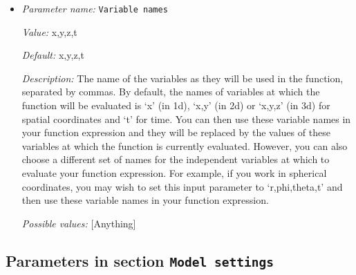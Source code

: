 \begin{itemize}
{\it Description:} The formula that denotes the function you want to evaluate for particular values of the independent variables. This expression may contain any of the usual operations such as addition or multiplication, as well as all of the common functions such as `sin' or `cos'. In addition, it may contain expressions like `if(x>0, 1, -1)' where the expression evaluates to the second argument if the first argument is true, and to the third argument otherwise. For a full overview of possible expressions accepted see the documentation of the muparser library at http://muparser.beltoforion.de/.

If the function you are describing represents a vector-valued function with multiple components, then separate the expressions for individual components by a semicolon.


{\it Possible values:} [Anything]
\item {\it Parameter name:} {\tt Variable names}
\label{parameters:Mesh refinement/Minimum refinement function/Variable names}


{\it Value:} x,y,z,t


{\it Default:} x,y,z,t


{\it Description:} The name of the variables as they will be used in the function, separated by commas. By default, the names of variables at which the function will be evaluated is `x' (in 1d), `x,y' (in 2d) or `x,y,z' (in 3d) for spatial coordinates and `t' for time. You can then use these variable names in your function expression and they will be replaced by the values of these variables at which the function is currently evaluated. However, you can also choose a different set of names for the independent variables at which to evaluate your function expression. For example, if you work in spherical coordinates, you may wish to set this input parameter to `r,phi,theta,t' and then use these variable names in your function expression.


{\it Possible values:} [Anything]
\end{itemize}

\subsection{Parameters in section \tt Model settings}
\label{parameters:Model_20settings}

